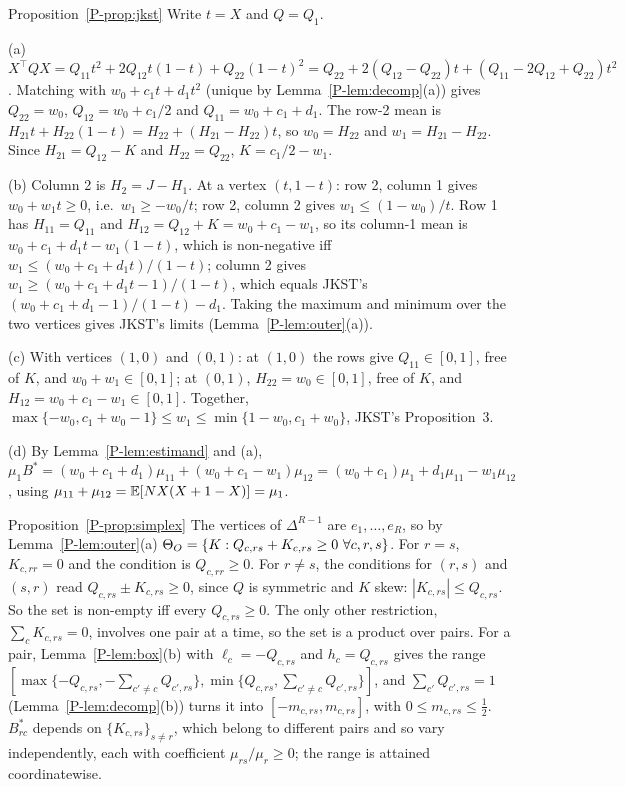 \begin{proofof}{Proposition~\ref{P-prop:jkst}}
Write $t=X$ and $Q=Q_1$.

(a) $X^\top QX=Q_{11}t^2+2Q_{12}t(1-t)+Q_{22}(1-t)^2
=Q_{22}+2(Q_{12}-Q_{22})t+(Q_{11}-2Q_{12}+Q_{22})t^2$. Matching with
$w_0+c_1t+d_1t^2$ (unique by Lemma~\ref{P-lem:decomp}(a)) gives $Q_{22}=w_0$,
$Q_{12}=w_0+c_1/2$ and $Q_{11}=w_0+c_1+d_1$. The row-2 mean is
$H_{21}t+H_{22}(1-t)=H_{22}+(H_{21}-H_{22})t$, so $w_0=H_{22}$ and
$w_1=H_{21}-H_{22}$. Since $H_{21}=Q_{12}-K$ and $H_{22}=Q_{22}$, $K=c_1/2-w_1$.

(b) Column 2 is $H_2=J-H_1$. At a vertex $(t,1-t)$: row 2, column 1 gives
$w_0+w_1t\ge0$, i.e.\ $w_1\ge-w_0/t$; row 2, column 2 gives $w_1\le(1-w_0)/t$. Row 1
has $H_{11}=Q_{11}$ and $H_{12}=Q_{12}+K=w_0+c_1-w_1$, so its column-1 mean is
$w_0+c_1+d_1t-w_1(1-t)$, which is non-negative iff
$w_1\le(w_0+c_1+d_1t)/(1-t)$; column 2 gives $w_1\ge(w_0+c_1+d_1t-1)/(1-t)$, which
equals JKST's $(w_0+c_1+d_1-1)/(1-t)-d_1$. Taking the maximum and minimum over the two
vertices gives JKST's limits (Lemma~\ref{P-lem:outer}(a)).

(c) With vertices $(1,0)$ and $(0,1)$: at $(1,0)$ the rows give $Q_{11}\in[0,1]$, free
of $K$, and $w_0+w_1\in[0,1]$; at $(0,1)$, $H_{22}=w_0\in[0,1]$, free of $K$, and
$H_{12}=w_0+c_1-w_1\in[0,1]$. Together,
$\max\{-w_0,c_1+w_0-1\}\le w_1\le\min\{1-w_0,c_1+w_0\}$, JKST's Proposition~3.

(d) By Lemma~\ref{P-lem:estimand} and (a),
$\mu_1B^*=(w_0+c_1+d_1)\mu_{11}+(w_0+c_1-w_1)\mu_{12}=(w_0+c_1)\mu_1+d_1\mu_{11}-w_1\mu_{12}$,
using $\mu_{11}+\mu_{12}=\mathbb E[NX(X+1-X)]=\mu_1$.
\end{proofof}

\begin{proofof}{Proposition~\ref{P-prop:simplex}}
The vertices of $\Delta^{R-1}$ are $e_1,\dots,e_R$, so by Lemma~\ref{P-lem:outer}(a)
$\Theta_O=\{K:Q_{c,rs}+K_{c,rs}\ge0\ \forall c,r,s\}$. For $r=s$, $K_{c,rr}=0$ and the
condition is $Q_{c,rr}\ge0$. For $r\ne s$, the conditions for $(r,s)$ and $(s,r)$ read
$Q_{c,rs}\pm K_{c,rs}\ge0$, since $Q$ is symmetric and $K$ skew: $|K_{c,rs}|\le
Q_{c,rs}$. So the set is non-empty iff every $Q_{c,rs}\ge0$. The only other
restriction, $\sum_cK_{c,rs}=0$, involves one pair at a time, so the set is a product
over pairs. For a pair, Lemma~\ref{P-lem:box}(b) with $\ell_c=-Q_{c,rs}$ and
$h_c=Q_{c,rs}$ gives the range
$[\max\{-Q_{c,rs},-\sum_{c'\ne c}Q_{c',rs}\},\min\{Q_{c,rs},\sum_{c'\ne c}Q_{c',rs}\}]$,
and $\sum_{c'}Q_{c',rs}=1$ (Lemma~\ref{P-lem:decomp}(b)) turns it into
$[-m_{c,rs},m_{c,rs}]$, with $0\le m_{c,rs}\le\tfrac12$. $B^*_{rc}$ depends on
$\{K_{c,rs}\}_{s\ne r}$, which belong to different pairs and so vary independently,
each with coefficient $\mu_{rs}/\mu_r\ge0$; the range is attained coordinatewise.
\end{proofof}

